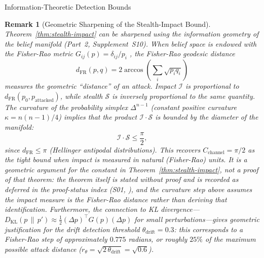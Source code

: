 \documentclass[
  ignorenonframetext,
]{beamer}
\providecommand{\cref}[1]{\texttt{\detokenize{#1}}}
\newtheorem{remark}[theorem]{Remark}
\begin{document}
\begin{frame}[allowframebreaks]{Information-Theoretic Detection Bounds}
\begin{remark}[Geometric Sharpening of the Stealth-Impact Bound]
\label{rem:geometric-bound}
Theorem~\ref{thm:stealth-impact} can be sharpened using the information
geometry of the belief manifold (Part~2, Supplement~S10).  When belief
space is endowed with the Fisher-Rao metric
$G_{ij}(p) = \delta_{ij}/p_i$ \cite{amari2000methods}, the Fisher-Rao geodesic distance
\[
d_{\mathrm{FR}}(p, q) = 2\arccos\!\left(\sum_i \sqrt{p_i q_i}\right)
\]
measures the geometric ``distance'' of an attack.  Impact $\mathcal{I}$
is proportional to $d_{\mathrm{FR}}(p_0, p_{\text{attacked}})$, while
stealth $\mathcal{S}$ is inversely proportional to the same quantity.
The curvature of the probability simplex $\Delta^{n-1}$ (constant
positive curvature $\kappa = n(n-1)/4$) implies that the product
$\mathcal{I} \cdot \mathcal{S}$ is bounded by the diameter of the manifold:
\[
\mathcal{I} \cdot \mathcal{S} \leq \frac{\pi}{2},
\]
since $d_{\mathrm{FR}} \leq \pi$ (Hellinger antipodal distributions).
This recovers $C_{\text{channel}} = \pi/2$ as the tight bound when impact
is measured in natural (Fisher-Rao) units. It is a geometric \emph{argument}
for the constant in Theorem~\ref{thm:stealth-impact}, not a proof of that
theorem: the theorem itself is stated without proof and is recorded as
deferred in the proof-status index (S01, \cref{sec:proof-status}), and the
curvature step above assumes the impact measure is the Fisher-Rao distance
rather than deriving that identification.
Furthermore, the connection to KL divergence---$D_{\mathrm{KL}}(p \,\|\, p')
\approx \tfrac{1}{2}(\Delta p)^\top G(p)(\Delta p)$ for small
perturbations---gives geometric justification for the drift detection
threshold $\theta_{\text{drift}} = 0.3$: this corresponds to a
Fisher-Rao step of approximately $0.775$ radians, or roughly $25\%$ of
the maximum possible attack distance ($r_\theta = \sqrt{2\,\theta_{\text{drift}}} = \sqrt{0.6}$).
\end{remark}

\end{frame}
\end{document}
